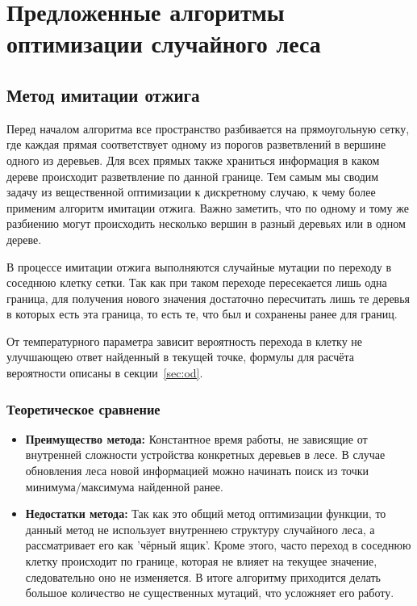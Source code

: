 \chapter{Предложенные алгоритмы оптимизации случайного леса}\label{chap:second}

\section{Метод имитации отжига}\label{sec:odod}

Перед началом алгоритма все пространство разбивается на прямоугольную сетку, где
каждая прямая соответствует одному из порогов разветвлений в вершине одного из
деревьев. Для всех прямых также храниться информация в каком дереве происходит
разветвление по данной границе. Тем самым мы сводим задачу из вещественной
оптимизации к дискретному случаю, к чему более применим алгоритм имитации
отжига. Важно заметить, что по одному и тому же разбиению могут происходить
несколько вершин в разный деревьях или в одном дереве.

В процессе имитации отжига выполняются случайные мутации по переходу в соседнюю
клетку сетки. Так как при таком переходе пересекается лишь одна граница, для
получения нового значения достаточно пересчитать лишь те деревья в которых есть
эта граница, то есть те, что был и сохранены ранее для границ.

От температурного параметра зависит вероятность перехода в клетку не улучшающею
ответ найденный в текущей точке, формулы для расчёта вероятности описаны
в секции~\ref{sec:od}.

\subsection{Теоретическое сравнение}

\begin{itemize}
    \item \textbf{Преимущество метода:} Константное время работы, не
    зависящие от внутренней сложности устройства конкретных деревьев в лесе.
    В случае обновления леса новой информацией можно начинать поиск из точки
    минимума/максимума найденной ранее.
    \item \textbf{Недостатки метода:} Так как это общий метод оптимизации функции, то
    данный метод не использует внутреннею структуру случайного леса,
    а рассматривает его как 'чёрный ящик'. Кроме этого, часто переход в соседнюю
    клетку происходит по границе, которая не влияет на текущее значение,
    следовательно оно не изменяется. В итоге алгоритму приходится делать большое
    количество не существенных мутаций, что усложняет его работу.
\end{itemize}

